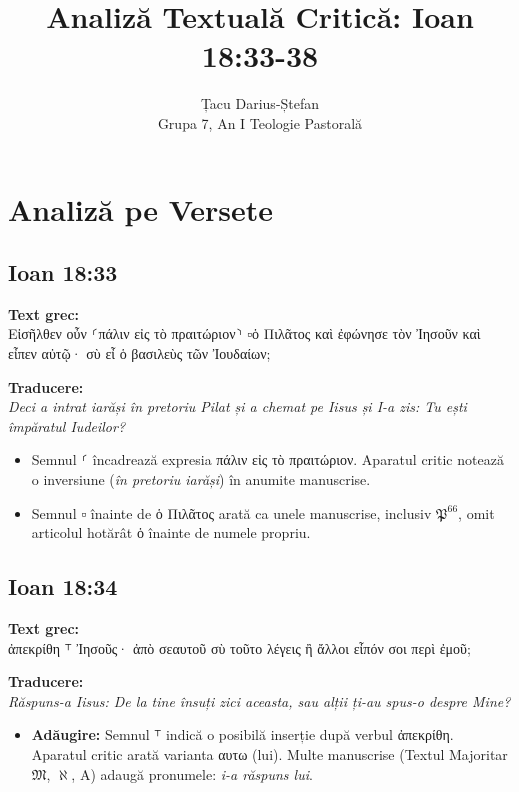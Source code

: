 \documentclass[11pt, a4paper]{article}
\title{Analiză Textuală Critică: Ioan 18:33-38}
\author{Țacu Darius-Ștefan \\ Grupa 7, An I Teologie Pastorală}
\date{}
\newcommand{\textgreek}[1]{\foreignlanguage{greek}{#1}}
\begin{document}
\maketitle

\section{Analiză pe Versete}

\subsection{Ioan 18:33}
\textbf{Text grec:} \\
\textgreek{Εἰσῆλθεν οὖν ⸂πάλιν εἰς τὸ πραιτώριον⸃ ▫ὁ Πιλᾶτος καὶ ἐφώνησε τὸν Ἰησοῦν καὶ εἶπεν αὐτῷ· σὺ εἶ ὁ βασιλεὺς τῶν Ἰουδαίων;}

\textbf{Traducere:} \\
\textit{Deci a intrat iarăși în pretoriu Pilat și a chemat pe Iisus și I-a zis: Tu ești împăratul Iudeilor?}

\begin{itemize}
    \item Semnul \textgreek{⸂} încadrează expresia \textgreek{πάλιν εἰς τὸ πραιτώριον}. Aparatul critic notează o inversiune (\textit{în pretoriu iarăși}) în anumite manuscrise.

    \item Semnul \textgreek{▫} înainte de \textgreek{ὁ Πιλᾶτος} arată ca unele manuscrise, inclusiv $\mathfrak{P}^{66}$, omit articolul hotărât \textgreek{ὁ} înainte de numele propriu.
\end{itemize}

\subsection{Ioan 18:34}
\textbf{Text grec:} \\
\textgreek{ἀπεκρίθη ⸆ Ἰησοῦς· ἀπὸ σεαυτοῦ σὺ τοῦτο λέγεις ἢ ἄλλοι εἶπόν σοι περὶ ἐμοῦ;}

\textbf{Traducere:} \\
\textit{Răspuns-a Iisus: De la tine însuți zici aceasta, sau alții ți-au spus-o despre Mine?}

\begin{itemize}
    \item \textbf{Adăugire:} Semnul \textgreek{⸆} indică o posibilă inserție după verbul \textgreek{ἀπεκρίθη}.  Aparatul critic arată varianta \textgreek{αυτω} (lui). Multe manuscrise (Textul Majoritar $\mathfrak{M}$, $\aleph$, A) adaugă pronumele: \textit{i-a răspuns lui}.
\end{itemize}
\end{document}
